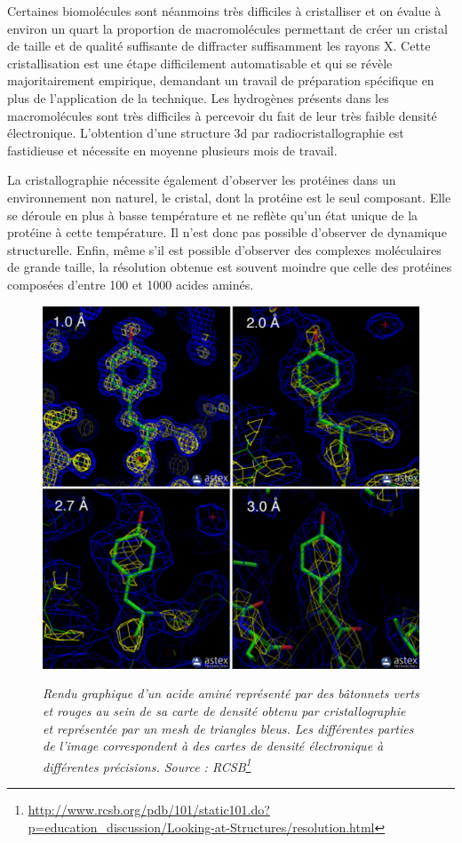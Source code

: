 Certaines biomolécules sont néanmoins très difficiles à cristalliser et on évalue à environ un quart la proportion de macromolécules permettant de créer un cristal de taille et de qualité suffisante de diffracter suffisamment les rayons X. Cette cristallisation est une étape difficilement automatisable et qui se révèle majoritairement empirique, demandant un travail de préparation spécifique en plus de l'application de la technique. Les hydrogènes présents dans les macromolécules sont très difficiles à percevoir du fait de leur très faible densité électronique. L'obtention d'une structure 3d par radiocristallographie est fastidieuse et nécessite en moyenne plusieurs mois de travail.

La cristallographie nécessite également d'observer les protéines dans un environnement non naturel, le cristal, dont la protéine est le seul composant. Elle se déroule en plus à basse température et ne reflète qu'un état unique de la protéine à cette température. Il n'est donc pas possible d'observer de dynamique structurelle. Enfin, même s'il est possible d'observer des complexes moléculaires de grande taille, la résolution obtenue est souvent moindre que celle des protéines composées d'entre 100 et 1000 acides aminés.


\begin{figure}[h]
  \centering
  {\includegraphics[width=0.5\linewidth]{./figures/ch1/resolution_xray.pdf}}
    \caption[Rendu graphique d'un acide aminé et de sa carte de densité obtenue par cristallographie.]{\it Rendu graphique d'un acide aminé représenté par des bâtonnets verts et rouges au sein de sa carte de densité obtenu par cristallographie et représentée par un mesh de triangles bleus. Les différentes parties de l'image correspondent à des cartes de densité électronique à différentes précisions. Source : RCSB\footnote{\url{http://www.rcsb.org/pdb/101/static101.do?p=education_discussion/Looking-at-Structures/resolution.html}}}
    \label{Fig:resolution_xray}
  \hspace{0.2cm}
\end{figure}

